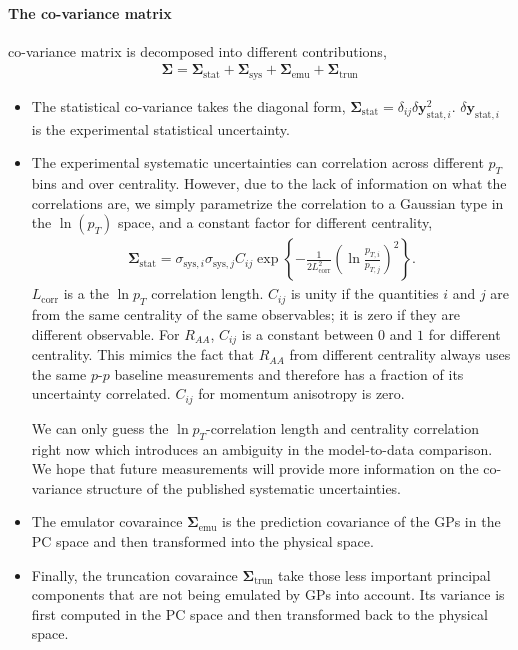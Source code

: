 \paragraph{The co-variance matrix} co-variance matrix is decomposed into different contributions,
\begin{eqnarray}
\mathbf{\Sigma} = \mathbf{\Sigma}_{\textrm{stat}} + \mathbf{\Sigma}_{\textrm{sys}} + \mathbf{\Sigma}_{\textrm{emu}} + \mathbf{\Sigma}_{\textrm{trun}}
\end{eqnarray}
\begin{itemize}
\item The statistical co-variance takes the diagonal form, $\mathbf{\Sigma}_{\textrm{stat}} = \delta_{ij}\delta\mathbf{y}_{\textrm{stat}, i}^2$. 
$\delta\mathbf{y}_{\textrm{stat}, i}$ is the experimental statistical uncertainty.
\item The experimental systematic uncertainties can correlation across different $p_T$ bins and over centrality. 
However, due to the lack of information on what the correlations are, we simply parametrize the correlation to a Gaussian type in the $\ln(p_T)$ space, and a constant factor for different centrality,
\begin{eqnarray}
\mathbf{\Sigma}_{\textrm{stat}} = \sigma_{\textrm{sys}, i}\sigma_{\textrm{sys}, j} C_{ij} \exp\left\{-\frac{1}{2 L_{\textrm{corr}}^2} \left(\ln\frac{p_{T, i}}{p_{T, j}}\right)^2 \right\}.
\end{eqnarray}
$L_{\textrm{corr}}$ is a the $\ln p_T$ correlation length. 
$C_{ij}$ is unity if the quantities $i$ and $j$ are from the same centrality of the same observables; it is zero if they are different observable. 
For $R_{AA}$, $C_{ij}$ is a constant between $0$ and $1$ for different centrality. This mimics the fact that $R_{AA}$ from different centrality always uses the same $p$-$p$ baseline measurements and therefore has a fraction of its uncertainty correlated.
$C_{ij}$ for momentum anisotropy is zero.

We can only guess the $\ln p_T$-correlation length and centrality correlation right now which introduces an ambiguity in the model-to-data comparison.
We hope that future measurements will provide more information on the co-variance structure of the published systematic uncertainties.
\item The emulator covaraince $\mathbf{\Sigma}_{\textrm{emu}}$ is the prediction covariance of the GPs in the PC space and then transformed into the physical space.
\item Finally, the truncation covaraince $\mathbf{\Sigma}_{\textrm{trun}}$ take those less important principal components that are not being emulated by GPs into account. 
Its variance is first computed in the PC space and then transformed back to the physical space.
\end{itemize}

